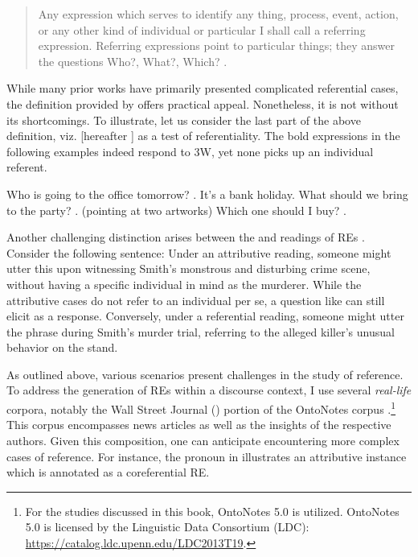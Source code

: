 \begin{quote}
	Any expression which serves to identify any thing, process, event, action, or any other kind of individual or particular I shall call a referring expression. Referring expressions point to particular things; they answer the questions Who?, What?, Which? \citep[27]{searle1969speech}.
\end{quote}

While many prior works have primarily presented complicated referential cases, the definition provided by \citeauthor{searle1969speech} offers practical appeal. Nonetheless, it is not without its shortcomings. To illustrate, let us consider the last part of the above definition, viz.  [hereafter ] as a test of referentiality. The bold expressions in the following examples indeed respond to 3W, yet none picks up an individual referent.

\begin{exe}
	\ex
	\begin{xlist}
		\ex Who is going to the office tomorrow? . It's a bank holiday.
		\ex What should we bring to the party? .
		\ex (pointing at two artworks) Which one should I buy? . 
	\end{xlist}
\end{exe} 

Another challenging distinction arises between the  and  readings of REs \citep{donnellan1966reference,van2016computational}. Consider the following sentence:  Under an attributive reading, someone might utter this upon witnessing Smith's monstrous and disturbing crime scene, without having a specific individual in mind as the murderer. While the attributive cases do not refer to an individual per se, a question like  can still elicit  as a response. Conversely, under a referential reading, someone might utter the phrase during Smith's murder trial, referring to the alleged killer's unusual behavior on the stand. 

As outlined above, various scenarios present challenges in the study of reference. To address the generation of REs within a discourse context, I use several \emph{real-life} corpora, notably the Wall Street Journal (\wsj) portion of the OntoNotes corpus \citep[hereafter referred to as \onto,][]{weischedel2013ontonotes}.\footnote{For the studies discussed in this book, OntoNotes 5.0 is utilized. OntoNotes 5.0 is licensed by the Linguistic Data Consortium (LDC): \url{https://catalog.ldc.upenn.edu/LDC2013T19}.} This corpus encompasses news articles as well as the insights of the respective authors. Given this composition, one can anticipate encountering more complex cases of reference. For instance, the pronoun  in  illustrates an attributive instance which is annotated as a coreferential RE.


